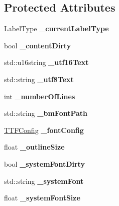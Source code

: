 \subsection*{Protected Attributes}
\begin{DoxyCompactItemize}
\item 
\mbox{\label{classLabel_a474b9e672d007ec0d136d9a98dab8091}} 
Label\+Type {\bfseries \+\_\+current\+Label\+Type}
\item 
\mbox{\label{classLabel_a74f4c68da65ff9a642696ba6cd22412c}} 
bool {\bfseries \+\_\+content\+Dirty}
\item 
\mbox{\label{classLabel_ab29a075a44236be2956d9d770394ba9f}} 
std\+::u16string {\bfseries \+\_\+utf16\+Text}
\item 
\mbox{\label{classLabel_afa4df96e1f52286fc2c5ee7cbd7bb0da}} 
std\+::string {\bfseries \+\_\+utf8\+Text}
\item 
\mbox{\label{classLabel_a2bbad91a625ff3d2d175eb70add1201e}} 
int {\bfseries \+\_\+number\+Of\+Lines}
\item 
\mbox{\label{classLabel_a74922b3ce726f42e442d78919e476c2b}} 
std\+::string {\bfseries \+\_\+bm\+Font\+Path}
\item 
\mbox{\label{classLabel_a4a6b76c6b836b0d59235e12113fba343}} 
\hyperlink{structTTFConfig}{T\+T\+F\+Config} {\bfseries \+\_\+font\+Config}
\item 
\mbox{\label{classLabel_a9f4f202c12ce4b296d6f2f8153fee968}} 
float {\bfseries \+\_\+outline\+Size}
\item 
\mbox{\label{classLabel_a8b3a0058ad1bda9b0c54ff08c7cb99df}} 
bool {\bfseries \+\_\+system\+Font\+Dirty}
\item 
\mbox{\label{classLabel_aa6f26a8d91e9c32f756605641a97331f}} 
std\+::string {\bfseries \+\_\+system\+Font}
\item 
\mbox{\label{classLabel_a1bc83b820945b5afd7939a09bf9b51dc}} 
float {\bfseries \+\_\+system\+Font\+Size}
\item 

\end{DoxyCompactItemize}
